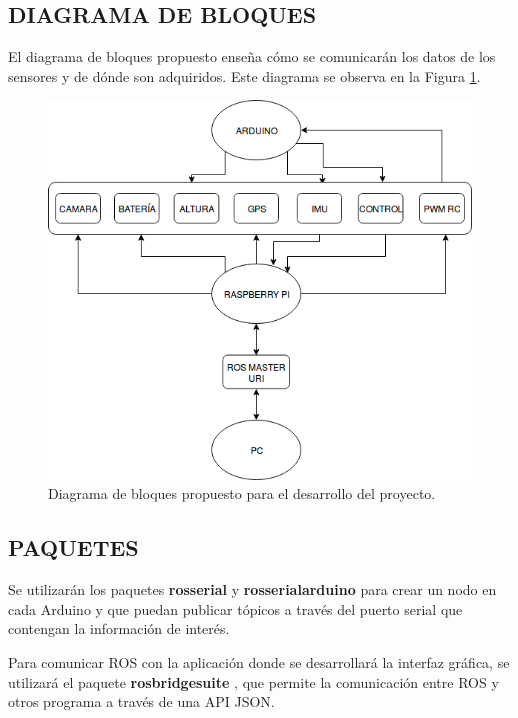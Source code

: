 \documentclass[letterpaper, 10 pt, conference]{ieeeconf}  %
\begin{document}
\subsection{DIAGRAMA DE BLOQUES}
El diagrama de bloques propuesto enseña cómo se comunicarán los datos de los sensores y de dónde son adquiridos. Este diagrama se observa en la Figura \ref{diagrama_bloques}.

\begin{figure}[htpb]
	\centering
	\includegraphics[width=0.99\columnwidth]{diagrama_bloques.png}
	\caption{Diagrama de bloques propuesto para el desarrollo del proyecto.}
	\label{diagrama_bloques}
\end{figure}


\subsection{PAQUETES}
\label{paquetes}
Se utilizarán los paquetes \textbf{rosserial} \cite{rosserial} y \textbf{rosserial\textunderscore arduino} \cite{rosserialarduino} para crear un nodo en cada Arduino y que puedan publicar tópicos a través del puerto serial que contengan la información de interés.

Para comunicar ROS con la aplicación donde se desarrollará la interfaz gráfica, se utilizará el paquete \textbf{rosbridge\textunderscore suite} \cite{rosbridge}, que permite la comunicación entre ROS y otros programa a través de una API JSON.
\end{document}
